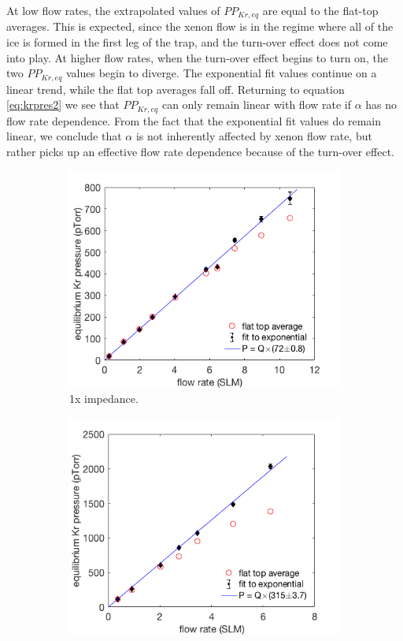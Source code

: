 At low flow rates, the extrapolated values of $PP_{Kr,eq}$ are equal to the flat-top averages. This is expected, since the xenon flow is in the regime where all of the ice is formed in the first leg of the trap, and the turn-over effect does not come into play. At higher flow rates, when the turn-over effect begins to turn on, the two $PP_{Kr,eq}$ values begin to diverge. The exponential fit values continue on a linear trend, while the flat top averages fall off. Returning to equation \ref{eq:krpres2} we see that $PP_{Kr,eq}$ can only remain linear with flow rate if $\alpha$ has no flow rate dependence. From the fact that the exponential fit values do remain linear, we conclude that $\alpha$ is not inherently affected by xenon flow rate, but rather picks up an effective flow rate dependence because of the turn-over effect.
\begin{figure}[h!]
\centering
\begin{subfigure}{0.5\textwidth}
  \centering
  \includegraphics[width=\textwidth]{Figures/SLAC_FlowResponse_1x_linfit.png}
  \caption{1x impedance.}
  \label{fig:flowresponse1x}
\end{subfigure}%
\begin{subfigure}{0.5\textwidth}
  \centering
  \includegraphics[width=\textwidth]{Figures/SLAC_FlowResponse_15x_linplot.png}

\end{subfigure}
\end{figure}

